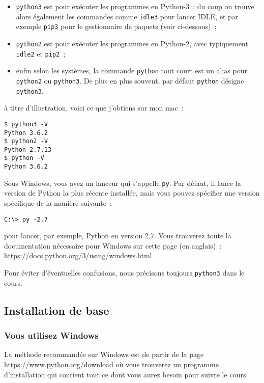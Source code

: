 \begin{itemize}
\item
  \texttt{python3} est pour exécuter les programmes en Python-3~; du
  coup on trouve alors également les commandes comme \texttt{idle3} pour
  lancer IDLE, et par exemple \texttt{pip3} pour le gestionnaire de
  paquets (voir ci-dessous)~;
\item
  \texttt{python2} est pour exécuter les programmes en Python-2, avec
  typiquement \texttt{idle2} et \texttt{pip2}~;
\item
  enfin selon les systèmes, la commande \texttt{python} tout court est
  un alias pour \texttt{python2} ou \texttt{python3}. De plus en plus
  souvent, par défaut \texttt{python} désigne \texttt{python3}.
\end{itemize}

à titre d'illustration, voici ce que j'obtiens sur mon mac~:

\begin{verbatim}
$ python3 -V
Python 3.6.2
$ python2 -V
Python 2.7.13
$ python -V
Python 3.6.2
\end{verbatim}

Sous Windows, vous avez un lanceur qui s'appelle \texttt{py}. Par
défaut, il lance la version de Python la plus récente installée, mais
vous pouvez spécifier une version spécifique de la manière suivante~:

\begin{verbatim}
C:\> py -2.7
\end{verbatim}

pour lancer, par exemple, Python en version 2.7. Vous trouverez toute la
documentation nécessaire pour Windows sur cette page (en anglais)~:
https://docs.python.org/3/using/windows.html

Pour éviter d'éventuelles confusions, nous précisons toujours
\texttt{python3} dans le cours.

    \hypertarget{installation-de-base}{%
\subsection{Installation de base}\label{installation-de-base}}

    \hypertarget{vous-utilisez-windows}{%
\subsubsection{Vous utilisez Windows}\label{vous-utilisez-windows}}

    La méthode recommandée sur Windows est de partir de la page
https://www.python.org/download où vous trouverez un programme
d'installation qui contient tout ce dont vous aurez besoin pour suivre
le cours.

